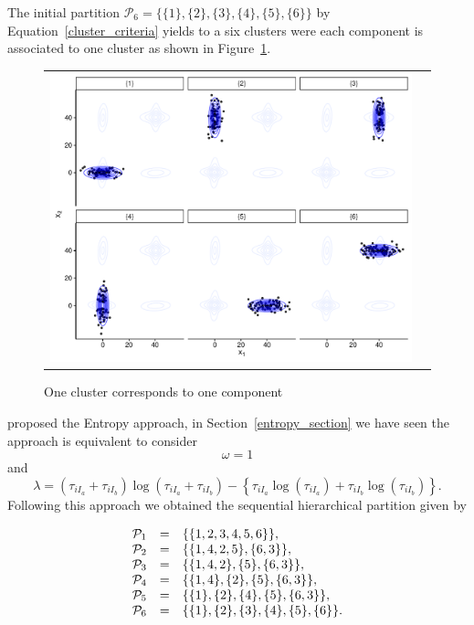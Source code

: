 \documentclass[submit]{smj}
\theoremstyle{definition}
\begin{document}
The initial partition  $\mathcal{P}_6 = \{ \{1\},\{2\}, \{3\}, \{4\}, \{5\}, \{6\} \}$  by Equation~\ref{cluster_criteria} yields to a six clusters were each component is associated to one cluster as shown in Figure~\ref{ex_one_one}.

\begin{figure}[h]
\begin{center}
\begin{tabular}{cc}
  \includegraphics[width=\textwidth]{figures/partition-example-part6.pdf} \\
 \end{tabular}
 \caption{One cluster corresponds to one component}\label{ex_one_one}
\end{center}
\end{figure}

\cite{baudry2010combining} proposed the Entropy approach, in Section~\ref{entropy_section} we have seen the approach is equivalent to consider \[\omega = 1\] and \[\lambda = (\tau_{iI_a}+\tau_{iI_b}) \log(\tau_{iI_a} + \tau_{iI_b}) - \left\{ \tau_{iI_a} \log(\tau_{iI_a}) + \tau_{iI_b} \log(\tau_{iI_b}) \right\}.\] Following this approach we obtained the sequential hierarchical partition given by 

\begin{equation}
\begin{array}{r c l}
\mathcal{P}_1 &=& \{\{1, 2, 3, 4, 5, 6\}\}, \\
\mathcal{P}_2 &=& \{\{1, 4, 2, 5\}, \{6, 3\} \},  \\
\mathcal{P}_3 &=& \{\{1, 4, 2\}, \{5\}, \{6, 3\} \}, \\
\mathcal{P}_4 &=& \{\{1, 4\},\{2\}, \{5\}, \{6, 3\} \}, \\
\mathcal{P}_5 &=& \{\{1\},\{2\},\{4\},\{5\},\{6,3\} \},\\
\mathcal{P}_6 &=& \{\{1\},\{2\},\{3\},\{4\},\{5\},\{6\}\}.
\end{array}
\label{hier_ex}
\end{equation}
\end{document}
